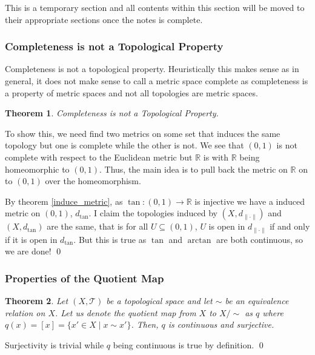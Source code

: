 \documentclass[
]{article}
\newtheorem{theorem}{Theorem}
\theoremstyle{definition}
\begin{document}
This is a temporary section and all contents within this section will be
moved to their appropriate sections once the notes is complete.

\hypertarget{completeness-is-not-a-topological-property}{%
\subsubsection{Completeness is not a Topological
Property}\label{completeness-is-not-a-topological-property}}

Completeness is not a topological property. Heuristically this makes
sense as in general, it does not make sense to call a metric space
complete as completeness is a property of metric spaces and not all
topologies are metric spaces.

\begin{theorem}
  Completeness is not a Topological Property.
\end{theorem}
\proof

To show this, we need find two metrics on some set that induces the same
topology but one is complete while the other is not. We see that
\((0, 1)\) is not complete with respect to the Euclidean metric but
\(\mathbb{R}\) is with \(\mathbb{R}\) being homeomorphic to \((0, 1)\).
Thus, the main idea is to pull back the metric on \(\mathbb{R}\) on to
\((0, 1)\) over the homeomorphism.

By theorem \ref{induce_metric}, as \(\tan : (0, 1) \to \mathbb{R}\) is
injective we have a induced metric on \((0, 1)\), \(d_{\tan}\). I claim
the topologies induced by \((X, d_{\| \cdot \|})\) and \((X, d_{\tan})\)
are the same, that is for all \(U \subseteq (0, 1)\), \(U\) is open in
\(d_{\| \cdot \|}\) if and only if it is open in \(d_{\tan}\). But this
is true as \(\tan\) and \(\arctan\) are both continuous, so we are done!
\qed

\hypertarget{properties-of-the-quotient-map}{%
\subsubsection{Properties of the Quotient
Map}\label{properties-of-the-quotient-map}}

\begin{theorem}
  Let \((X, \mathcal{T})\) be a topological space and let \(\sim\) be an equivalence 
  relation on \(X\). Let us denote the quotient map from \(X\) to \(X / \sim\) as 
  \(q\) where \(q(x) = [x] = \{x' \in X \mid x \sim x'\}\). Then, \(q\) is continuous
  and surjective.
\end{theorem}
\proof

Surjectivity is trivial while \(q\) being continuous is true by
definition. \qed
\end{document}
